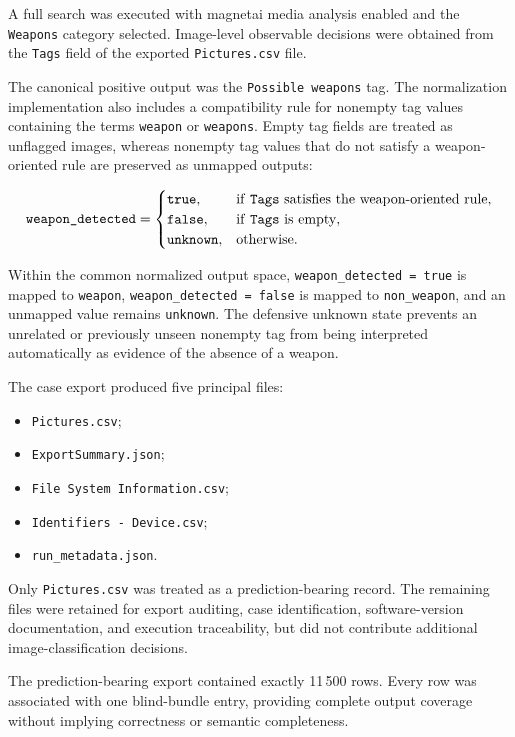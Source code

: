 A full search was executed with \gls{magnetai} media analysis enabled and the
\texttt{Weapons} category selected. Image-level observable decisions were
obtained from the \texttt{Tags} field of the exported
\texttt{Pictures.csv} file.

The canonical positive output was the \texttt{Possible weapons} tag. The
normalization implementation also includes a compatibility rule for nonempty
tag values containing the terms \texttt{weapon} or \texttt{weapons}. Empty tag
fields are treated as unflagged images, whereas nonempty tag values that do not
satisfy a weapon-oriented rule are preserved as unmapped outputs:

\[
\texttt{weapon\_detected}
=
\begin{cases}
\texttt{true},
&
\text{if \texttt{Tags} satisfies the weapon-oriented rule},
\\
\texttt{false},
&
\text{if \texttt{Tags} is empty},
\\
\texttt{unknown},
&
\text{otherwise}.
\end{cases}
\]

Within the common normalized output space,
\texttt{weapon\_detected = true} is mapped to \texttt{weapon},
\texttt{weapon\_detected = false} is mapped to
\texttt{non\_weapon}, and an unmapped value remains
\texttt{unknown}. The defensive unknown state prevents an unrelated or
previously unseen nonempty tag from being interpreted automatically as evidence
of the absence of a weapon.

The case export produced five principal files:

\begin{itemize}
\item \texttt{Pictures.csv};
\item \texttt{ExportSummary.json};
\item \texttt{File System Information.csv};
\item \texttt{Identifiers - Device.csv};
\item \texttt{run\_metadata.json}.
\end{itemize}

Only \texttt{Pictures.csv} was treated as a prediction-bearing record. The
remaining files were retained for export auditing, case identification,
software-version documentation, and execution traceability, but did not
contribute additional image-classification decisions.

The prediction-bearing export contained exactly 11\,500 rows. Every row was
associated with one blind-bundle entry, providing complete output coverage
without implying correctness or semantic completeness.

